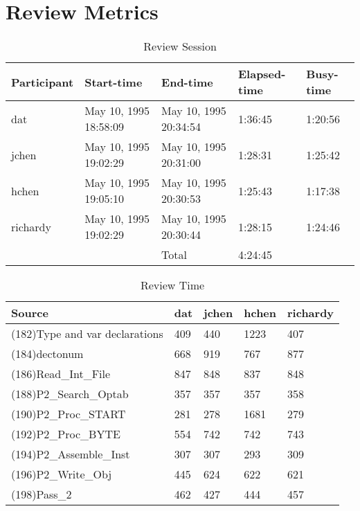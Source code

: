 \section{Review Metrics}
\begin{table}[hb]
\begin{center}
\begin{tabular}{|l|l|l|l|l|}
\hline
Participant & Start-time & End-time & Elapsed-time & Busy-time \\
\hline
dat & May 10, 1995 18:58:09 & May 10, 1995 20:34:54 & 1:36:45 & 1:20:56 \\
jchen & May 10, 1995 19:02:29 & May 10, 1995 20:31:00 & 1:28:31 & 1:25:42 \\
hchen & May 10, 1995 19:05:10 & May 10, 1995 20:30:53 & 1:25:43 & 1:17:38 \\
richardy & May 10, 1995 19:02:29 & May 10, 1995 20:30:44 & 1:28:15 & 1:24:46 \\
\hline
 & & Total & 4:24:45 & \\
\hline
\end{tabular}
\end{center}
\caption{Review Session}
\end{table}


\begin{table}[hb]
\begin{center}
\begin{tabular}{|l|l|l|l|l|}
\hline
Source & dat & jchen & hchen & richardy\\
\hline
(182)Type and var declarations & 409 & 440 & 1223 & 407\\
(184)dectonum & 668 & 919 & 767 & 877\\
(186)Read\_Int\_File & 847 & 848 & 837 & 848\\
(188)P2\_Search\_Optab & 357 & 357 & 357 & 358\\
(190)P2\_Proc\_START & 281 & 278 & 1681 & 279\\
(192)P2\_Proc\_BYTE & 554 & 742 & 742 & 743\\
(194)P2\_Assemble\_Inst & 307 & 307 & 293 & 309\\
(196)P2\_Write\_Obj & 445 & 624 & 622 & 621\\
(198)Pass\_2 & 462 & 427 & 444 & 457\\
\hline
\end{tabular}
\end{center}
\caption{Review Time}
\end{table}

